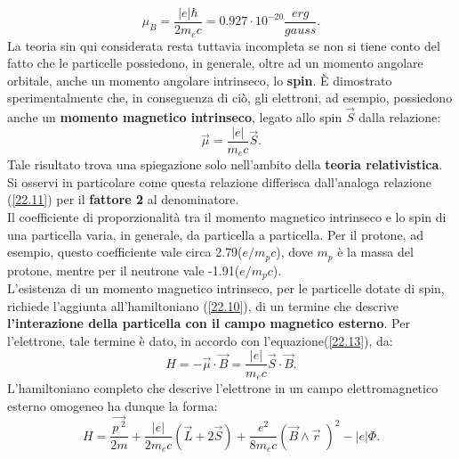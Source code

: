 \begin{equation}
\mu_{B}=\frac{|e|\hbar}{2m_{e}c}=0.927\cdot10^{-20}\frac{erg}{gauss} .
\end{equation}
La teoria sin qui considerata resta tuttavia incompleta se non si tiene conto del fatto che le particelle possiedono, in generale, oltre ad un momento angolare orbitale, anche un momento angolare intrinseco, lo \textbf{spin}. È dimostrato sperimentalmente che, in conseguenza di ciò, gli elettroni, ad esempio, possiedono anche un \textbf{momento magnetico intrinseco}, legato allo spin $\vec{S}$ dalla relazione:
\begin{equation}
\vec{\mu}=\frac{|e|}{m_{e}c}\vec{S} .
\label{22.13}
\end{equation}
Tale risultato trova una spiegazione solo nell'ambito della \textbf{teoria relativistica}. Si osservi in particolare come questa relazione differisca dall'analoga relazione (\ref{22.11}) per il \textbf{fattore 2} al denominatore.\\
Il coefficiente di proporzionalità tra il momento magnetico intrinseco e lo spin di una particella varia, in generale, da particella a particella. Per il protone, ad esempio, questo coefficiente vale circa 2.79($e/m_{p}c$), dove $m_{p}$ è la massa del protone, mentre per il neutrone vale -1.91($e/m_{p}c$).\\
L'esistenza di un momento magnetico intrinseco, per le particelle dotate di spin, richiede l'aggiunta all'hamiltoniano (\ref{22.10}), di un termine che descrive \textbf{l'interazione della particella con il campo magnetico esterno}. Per l'elettrone, tale termine è dato, in accordo con l'equazione(\ref{22.13}), da:
\begin{equation}
H=-\vec{\mu}\cdot\vec{B}=\frac{|e|}{m_{e}c}\vec{S}\cdot\vec{B} .
\end{equation}
L'hamiltoniano completo che descrive l'elettrone in un campo elettromagnetico esterno omogeneo ha dunque la forma:
\begin{equation}
H=\frac{\vec{p^{\;2}}}{2m}+\frac{|e|}{2m_{e}c}(\vec{L}+2\vec{S})+\frac{e^{2}}{8m_{e}c}(\vec{B}\wedge\vec{r}\;)^{2}-|e|\Phi .
\end{equation}